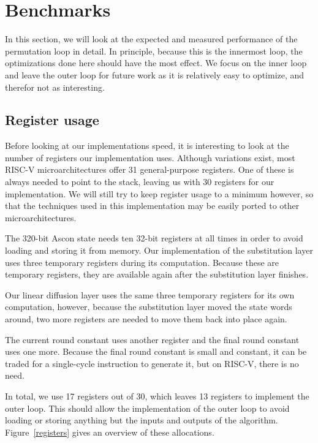 \section{Benchmarks}

In this section, we will look at the expected and measured performance of the
permutation loop in detail. In principle, because this is the innermost loop,
the optimizations done here should have the most effect. We focus on the inner
loop and leave the outer loop for future work as it is relatively easy to
optimize, and therefor not as interesting.

\subsection{Register usage}

Before looking at our implementations speed, it is interesting to look at the
number of registers our implementation uses. Although variations exist, most
RISC-V microarchitectures offer 31 general-purpose registers. One of these is
always needed to point to the stack, leaving us with 30 registers for our
implementation. We will still try to keep register usage to a minimum however,
so that the techniques used in this implementation may be easily ported to other
microarchitectures.

The 320-bit Ascon state needs ten 32-bit registers at all times in order to
avoid loading and storing it from memory. Our implementation of the substitution
layer uses three temporary registers during its computation. Because these are
temporary registers, they are available again after the substitution layer
finishes.

Our linear diffusion layer uses the same three temporary registers for its own
computation, however, because the substitution layer moved the state words
around, two more registers are needed to move them back into place again.

The current round constant uses another register and the final round constant
uses one more. Because the final round constant is small and constant, it can be
traded for a single-cycle instruction to generate it, but on RISC-V, there is no
need.

In total, we use 17 registers out of 30, which leaves 13 registers to implement
the outer loop. This should allow the implementation of the outer loop to avoid
loading or storing anything but the inputs and outputs of the algorithm.
Figure~\ref{registers} gives an overview of these allocations.

